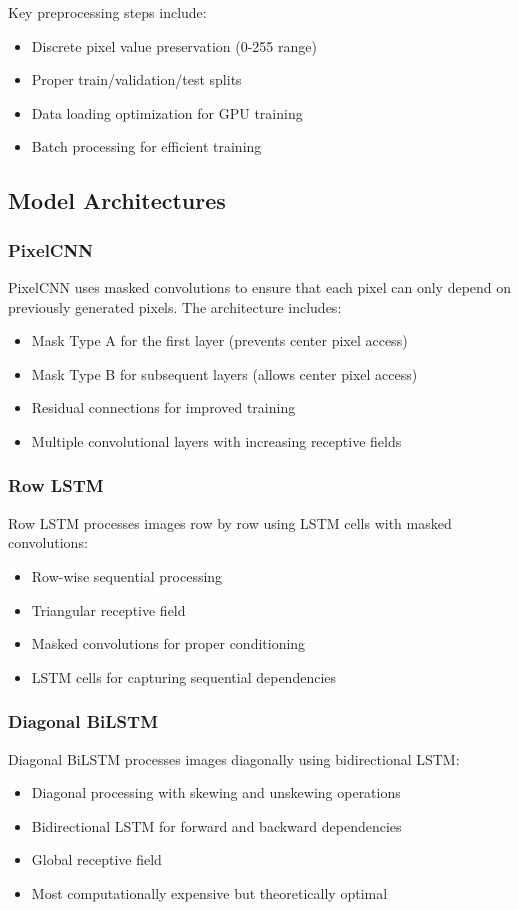 \documentclass[norunningheads]{llncs}
\begin{document}
Key preprocessing steps include:
\begin{itemize}
\item Discrete pixel value preservation (0-255 range)
\item Proper train/validation/test splits
\item Data loading optimization for GPU training
\item Batch processing for efficient training
\end{itemize}

\subsection{Model Architectures}

\subsubsection{PixelCNN}
PixelCNN uses masked convolutions to ensure that each pixel can only depend on previously generated pixels. The architecture includes:
\begin{itemize}
\item Mask Type A for the first layer (prevents center pixel access)
\item Mask Type B for subsequent layers (allows center pixel access)
\item Residual connections for improved training
\item Multiple convolutional layers with increasing receptive fields
\end{itemize}

\subsubsection{Row LSTM}
Row LSTM processes images row by row using LSTM cells with masked convolutions:
\begin{itemize}
\item Row-wise sequential processing
\item Triangular receptive field
\item Masked convolutions for proper conditioning
\item LSTM cells for capturing sequential dependencies
\end{itemize}

\subsubsection{Diagonal BiLSTM}
Diagonal BiLSTM processes images diagonally using bidirectional LSTM:
\begin{itemize}
\item Diagonal processing with skewing and unskewing operations
\item Bidirectional LSTM for forward and backward dependencies
\item Global receptive field
\item Most computationally expensive but theoretically optimal
\end{itemize}
\end{document}
